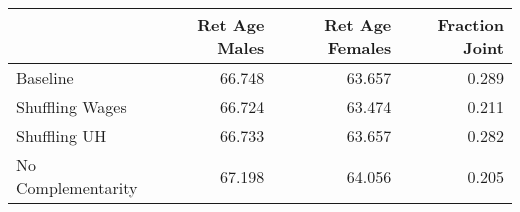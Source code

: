 \begin{tabular}{lrrr}
\toprule
{} & Ret Age Males & Ret Age Females & Fraction Joint \\
\midrule
Baseline           &        66.748 &          63.657 &          0.289 \\
Shuffling Wages    &        66.724 &          63.474 &          0.211 \\
Shuffling UH       &        66.733 &          63.657 &          0.282 \\
No Complementarity &        67.198 &          64.056 &          0.205 \\
\bottomrule
\end{tabular}
